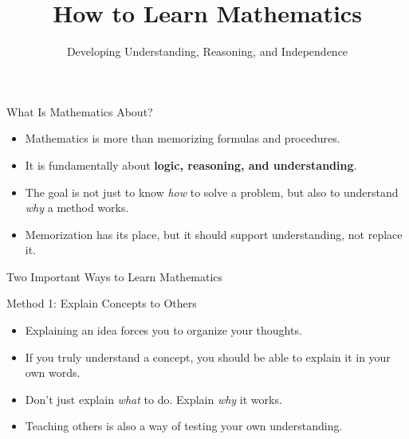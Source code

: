 \documentclass[aspectratio=169]{beamer}
\title{How to Learn Mathematics}
\subtitle{Developing Understanding, Reasoning, and Independence}
\author{}
\institute{}
\date{}
\begin{document}
\begin{frame}
    \titlepage
\end{frame}

\begin{frame}{What Is Mathematics About?}

    \begin{itemize}
        \item Mathematics is more than memorizing formulas
              and procedures.
        \pause

        \item It is fundamentally about
              \textbf{logic, reasoning, and understanding}.
        \pause

        \item The goal is not just to know \emph{how} to solve
              a problem, but also to understand \emph{why}
              a method works.
        \pause

        \item Memorization has its place, but it should support
              understanding, not replace it.
        \pause
    \end{itemize}

\end{frame}

\begin{frame}{Two Important Ways to Learn Mathematics}

    \begin{block}{Method 1: Explain Concepts to Others}
        \begin{itemize}
            \item Explaining an idea forces you to organize
                  your thoughts.
            \pause

            \item If you truly understand a concept, you should
                  be able to explain it in your own words.
            \pause

            \item Don't just explain \emph{what} to do.
                  Explain \emph{why} it works.
            \pause

            \item Teaching others is also a way of testing
                  your own understanding.
            \pause
        \end{itemize}
    \end{block}

\end{frame}
\end{document}

